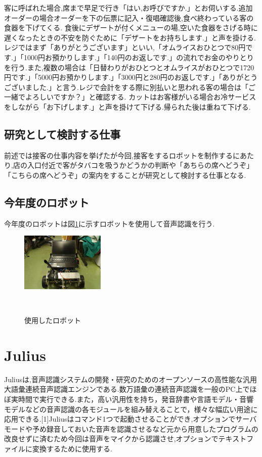 \documentclass[11pt]{si2016}
\begin{document}
客に呼ばれた場合,席まで早足で行き「はい,お呼びですか.」とお伺いする.追加オーダーの場合オーダーを下の伝票に記入・復唱確認後,食べ終わっている客の食器を下げてくる.
食後にデザートが付くメニューの場,空いた食器をさげる時に遅くなったときの不安を防ぐために「デザートをお持ちします.」と声を掛ける.
レジではまず「ありがとうございます」といい,「オムライスおひとつで80円です.」「1000円お預かりします.」「140円のお返しです.」の流れでお金のやりとりを行う.また,複数の場合は「日替わりがおひとつとオムライスがおひとつで1720円です.」「5000円お預かりします.」「3000円と280円のお返しです.」「ありがとうございました.」と言う.レジで会計をする際に別払いと思われる客の場合は「ご一緒でよろしいですか？」と確認する.
カットはお客様がいる場合お冷サービスをしながら「お下げします.」と声を掛けて下げる.帰られた後は重ねて下げる.


\subsection{研究として検討する仕事}
前述では接客の仕事内容を挙げたが今回,接客をするロボットを制作するにあたり,店の入口付近で客がタバコを吸うかどうかの判断や「あちらの席へどうぞ」「こちらの席へどうぞ」の案内をすることが研究として検討する仕事となる.


\subsection{今年度のロボット}
今年度のロボットは図\ref{fig:robot}に示すロボットを使用して音声認識を行う.


\begin{figure}[h]
 \begin{center}
  \includegraphics[width=40mm]{img/robo.png}
 　\caption{使用したロボット}
 　\label{fig:robot}
 \end{center}
\end{figure}


\section{Julius}
Juliusは,音声認識システムの開発・研究のためのオープンソースの高性能な汎用大語彙連続音声認識エンジンである.数万語彙の連続音声認識を一般のPC上でほぼ実時間で実行できる.また，高い汎用性を持ち，発音辞書や言語モデル・音響モデルなどの音声認識の各モジュールを組み替えることで，様々な幅広い用途に応用できる.[1]Juliusはコマンド1つで起動させることができ,オプションでサーバモードや予め録音しておいた音声を認識させるなど元から用意したプログラムの改良せずに済むため今回は音声をマイクから認識させ,オプションでテキストファイルに変換するために使用する.
\end{document}
